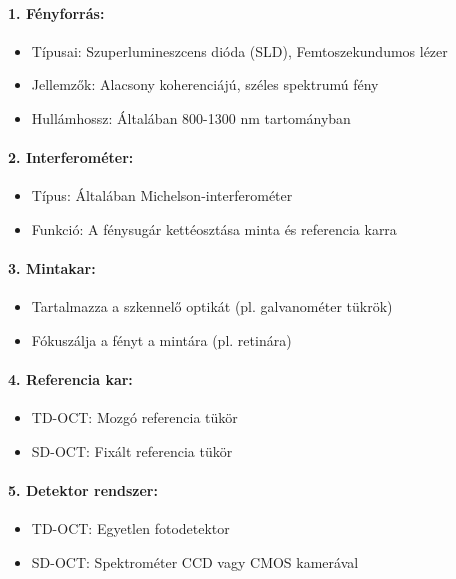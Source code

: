 \documentclass[a4paper,12pt]{article}
\begin{document}
\paragraph{1. Fényforrás:} \begin{itemize} \item Típusai: Szuperlumineszcens dióda (SLD), Femtoszekundumos lézer \item Jellemzők: Alacsony koherenciájú, széles spektrumú fény \item Hullámhossz: Általában 800-1300 nm tartományban \end{itemize}

\paragraph{2. Interferométer:} \begin{itemize} \item Típus: Általában Michelson-interferométer \item Funkció: A fénysugár kettéosztása minta és referencia karra \end{itemize}

\paragraph{3. Mintakar:} \begin{itemize} \item Tartalmazza a szkennelő optikát (pl. galvanométer tükrök) \item Fókuszálja a fényt a mintára (pl. retinára) \end{itemize}

\paragraph{4. Referencia kar:} \begin{itemize} \item TD-OCT: Mozgó referencia tükör \item SD-OCT: Fixált referencia tükör \end{itemize}

\paragraph{5. Detektor rendszer:} \begin{itemize} \item TD-OCT: Egyetlen fotodetektor \item SD-OCT: Spektrométer CCD vagy CMOS kamerával \end{itemize}
\end{document}
